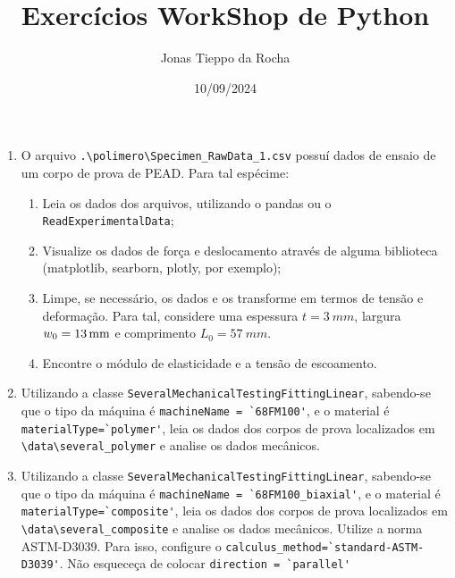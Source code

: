 \documentclass{article}
\title{Exercícios WorkShop de Python}
\author{Jonas Tieppo da Rocha}
\date{10/09/2024}
\begin{document}
\maketitle


\begin{enumerate}
    \item O arquivo \verb|.\polimero\Specimen_RawData_1.csv| possuí dados de ensaio de um corpo de prova de PEAD. Para tal espécime:
    \begin{enumerate}
        \item Leia os dados dos arquivos, utilizando o pandas ou o \verb|ReadExperimentalData|;
        \item Visualize os dados de força e deslocamento através de alguma biblioteca (matplotlib, searborn, plotly, por exemplo);
        \item Limpe, se necessário, os dados e os transforme em termos de tensão e deformação. Para tal, considere uma espessura $t=\qty{3}{mm}$, largura $w_0=\qtylist{13}{mm}$ e comprimento $L_0=\qty{57}{mm}$.
        \item Encontre o módulo de elasticidade e a tensão de escoamento.
    \end{enumerate}
    \item Utilizando a classe \verb |SeveralMechanicalTestingFittingLinear|, sabendo-se que o tipo da máquina é \verb|machineName = `68FM100'|,
    e o material é \verb|materialType=`polymer'|, leia os dados dos corpos de prova localizados em \verb|\data\several_polymer| e analise os dados mecânicos.

    \item Utilizando a classe \verb |SeveralMechanicalTestingFittingLinear|, sabendo-se que o tipo da máquina é \verb|machineName = `68FM100_biaxial'|,
    e o material é \verb|materialType=`composite'|, leia os dados dos corpos de prova localizados em \verb|\data\several_composite| e analise os dados mecânicos. Utilize a norma ASTM-D3039. Para isso, configure 
    o \newline \verb|calculus_method=`standard-ASTM-D3039'|. Não esqueceça de colocar \verb|direction = `parallel'|

\end{enumerate}
\end{document}
